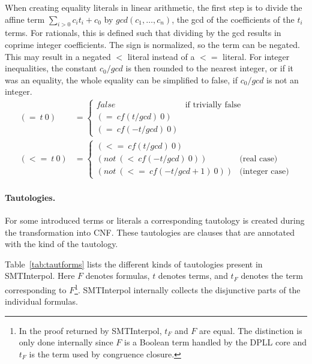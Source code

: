 \documentclass[a4paper]{article}
\newcommand\si{SMTInterpol\xspace}
\newcommand\cf{\mathit{cf}}
\begin{document}
When creating equality literals in linear arithmetic, the first step
is to divide the affine term $\sum_{i>0} c_i t_i + c_0$ by
$gcd(c_1,\dots,c_n)$, the gcd of the coefficients of the $t_i$ terms.
For rationals, this is defined such that dividing by the gcd results
in coprime integer coefficients.  The sign is normalized, so the term
can be negated.  This may result in a negated $<$ literal instead of a
$<=$ literal.  For integer inequalities, the constant $c_0/gcd$ is
then rounded to the nearest integer, or if it was an equality, the whole
equality can be simplified to false, if $c_0/gcd$ is not an integer.
\begin{align}
  (=\ t\ 0) &= \begin{cases} false & \text{if trivially false}\\
    (=\ \cf(t/gcd)\ 0) \\
    (=\ \cf(-t/gcd)\ 0)
  \end{cases}
  \tag{intern}\\
  (<=\ t\ 0) &= \begin{cases} 
    (<=\ \cf(t/gcd)\ 0) \\
    (not\ (<\ \cf(-t/gcd)\ 0)) &\text{(real case)}\\
    (not\ (<=\ \cf(-t/gcd + 1)\ 0))& \text{(integer case)}
  \end{cases}
  \tag{intern}
\end{align}


\paragraph{Tautologies.}
For some introduced terms or literals a corresponding tautology is
created during the transformation into CNF.  These tautologies are
clauses that are annotated with the kind of the tautology.

Table~\ref{tab:tautforms} lists the different kinds of tautologies present
in \si.  Here $F$ denotes formulas, $t$ denotes terms,
and $t_F$ denotes the term corresponding to $F$\footnote{In the proof returned
  by \si, $t_F$ and $F$ are equal.  The distinction is only done internally
  since $F$ is a Boolean term handled by the DPLL core and $t_F$ is the term
  used by congruence closure.}.
\si internally collects the disjunctive parts of the individual formulas.
\end{document}
